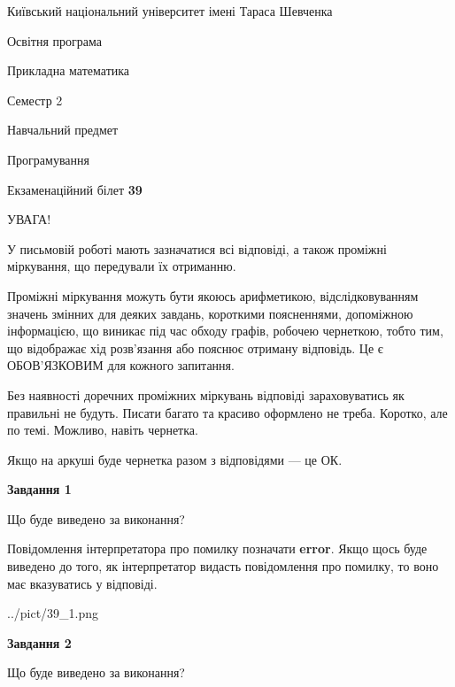 \documentclass[12pt, ukrainian]{article}
\begin{document}
{{\begin {small}\par
{ \center  Київський національний університет імені Тараса Шевченка \par}
{\parbox {5 cm}{Освітня програма \hfill}{\parbox {7 cm}{Прикладна математика \hfill}}\parbox {6 cm}{\hfill Семестр 2}}\par
{\parbox {5 cm} {Навчальний предмет \hfill}\parbox {7 cm}{Програмування \hfill}\parbox {6cm}{\hfill}\par}\vspace{-7pt} \end{small}}{\center Екзаменаційний білет \No \textbf
{ 39 }\par}}
{
\begin {large}
УВАГА!

У письмовій роботі мають зазначатися всі відповіді, а також проміжні міркування, що передували їх отриманню.

Проміжні міркування можуть бути якоюсь арифметикою, відслідковуванням зна\-чень змінних для деяких завдань,
короткими поясненнями, допоміжною інформацією, що виникає під час обходу графів, робочею чернеткою,
тобто тим, що відображає хід розв’язання або пояснює отриману відповідь.
Це є ОБОВ’ЯЗКОВИМ для кожного запитання.

Без наявності доречних проміжних міркувань відповіді зараховуватись як правиль\-ні не будуть.
Писати багато та красиво оформлено не треба. Коротко, але по темі. Можли\-во, навіть чернетка.

Якщо на аркуші буде чернетка разом з відповідями --- це ОК.

\newpage

{\begin {center}\textbf{Завдання 1}\end {center}}\par
Що буде виведено за виконання?

Повідомлення інтерпретатора про помилку позначати \textbf{error}.
Якщо щось буде виведено до того, як інтерпретатор видасть повідомлення про помилку, 
то воно має вказуватись у відповіді. \par


\begin{center}
	{../pict/39_1.png}
\end{center}
\newpage

{\begin {center}\textbf{Завдання 2}\end {center}}\par
Що буде виведено за виконання?


\end{large}}
\end{document}
